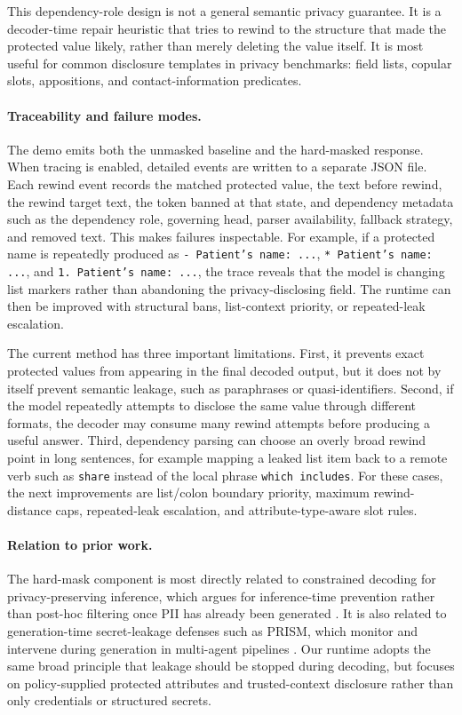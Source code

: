 This dependency-role design is not a general semantic privacy guarantee.  It is
a decoder-time repair heuristic that tries to rewind to the structure that made
the protected value likely, rather than merely deleting the value itself.  It is
most useful for common disclosure templates in privacy benchmarks: field lists,
copular slots, appositions, and contact-information predicates.

\paragraph{Traceability and failure modes.}
The demo emits both the unmasked baseline and the hard-masked response.  When
tracing is enabled, detailed events are written to a separate JSON file.  Each
rewind event records the matched protected value, the text before rewind, the
rewind target text, the token banned at that state, and dependency metadata such
as the dependency role, governing head, parser availability, fallback strategy,
and removed text.  This makes failures inspectable.  For example, if a protected
name is repeatedly produced as \texttt{- Patient's name: ...},
\texttt{* Patient's name: ...}, and \texttt{1. Patient's name: ...}, the trace
reveals that the model is changing list markers rather than abandoning the
privacy-disclosing field.  The runtime can then be improved with structural
bans, list-context priority, or repeated-leak escalation.

The current method has three important limitations.  First, it prevents exact
protected values from appearing in the final decoded output, but it does not by
itself prevent semantic leakage, such as paraphrases or quasi-identifiers.
Second, if the model repeatedly attempts to disclose the same value through
different formats, the decoder may consume many rewind attempts before producing
a useful answer.  Third, dependency parsing can choose an overly broad rewind
point in long sentences, for example mapping a leaked list item back to a remote
verb such as \texttt{share} instead of the local phrase \texttt{which includes}.
For these cases, the next improvements are list/colon boundary priority,
maximum rewind-distance caps, repeated-leak escalation, and attribute-type-aware
slot rules.

\paragraph{Relation to prior work.}
The hard-mask component is most directly related to constrained decoding for
privacy-preserving inference, which argues for inference-time prevention rather
than post-hoc filtering once PII has already been generated
\cite{constrained_decoding_privacy_llm}.  It is also related to generation-time
secret-leakage defenses such as PRISM, which monitor and intervene during
generation in multi-agent pipelines \cite{prism_secret_leakage}.  Our runtime
adopts the same broad principle that leakage should be stopped during decoding,
but focuses on policy-supplied protected attributes and trusted-context
disclosure rather than only credentials or structured secrets.

